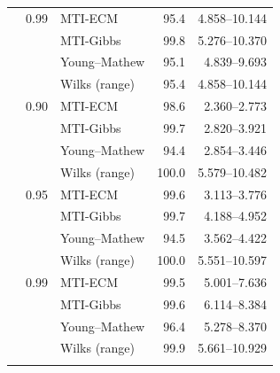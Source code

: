 \begin{longtable}{@{}rrlrr@{}}
\addlinespace[0.3em]
500 & 0.99 & MTI-ECM & 95.4 & 4.858--10.144 \\
 &  & MTI-Gibbs & 99.8 & 5.276--10.370 \\
 &  & Young--Mathew & 95.1 & 4.839--9.693 \\
 &  & Wilks (range) & 95.4 & 4.858--10.144 \\
\addlinespace[0.3em]
1000 & 0.90 & MTI-ECM & 98.6 & 2.360--2.773 \\
 &  & MTI-Gibbs & 99.7 & 2.820--3.921 \\
 &  & Young--Mathew & 94.4 & 2.854--3.446 \\
 &  & Wilks (range) & 100.0 & 5.579--10.482 \\
\addlinespace[0.3em]
1000 & 0.95 & MTI-ECM & 99.6 & 3.113--3.776 \\
 &  & MTI-Gibbs & 99.7 & 4.188--4.952 \\
 &  & Young--Mathew & 94.5 & 3.562--4.422 \\
 &  & Wilks (range) & 100.0 & 5.551--10.597 \\
\addlinespace[0.3em]
1000 & 0.99 & MTI-ECM & 99.5 & 5.001--7.636 \\
 &  & MTI-Gibbs & 99.6 & 6.114--8.384 \\
 &  & Young--Mathew & 96.4 & 5.278--8.370 \\
 &  & Wilks (range) & 99.9 & 5.661--10.929 \\
\addlinespace[0.3em]
\end{longtable}
\clearpage
